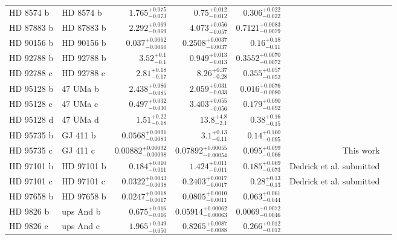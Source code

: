 \begin{longtable*}{llrrrrr}
HD 8574 b & HD 8574 b & $1.765^{+0.075}_{-0.073}$ & $0.75^{+0.012}_{-0.012}$ & $0.306^{+0.022}_{-0.022}$ & \cite{Perrier03} & \\
HD 87883 b & HD 87883 b & $2.292^{+0.069}_{-0.069}$ & $4.073^{+0.056}_{-0.057}$ & $0.7121^{+0.0083}_{-0.0079}$ & \cite{Fischer09} & \\
HD 90156 b & HD 90156 b & $0.037^{+0.0062}_{-0.0060}$ & $0.2508^{+0.0037}_{-0.0037}$ & $0.16^{+0.18}_{-0.11}$ & \cite{Mordasini11} & \\
HD 92788 b & HD 92788 b & $3.52^{+0.1}_{-0.1}$ & $0.949^{+0.013}_{-0.013}$ & $0.3552^{+0.0070}_{-0.0072}$ & \cite{Fischer01} & \\
HD 92788 c & HD 92788 c & $2.81^{+0.18}_{-0.17}$ & $8.26^{+0.37}_{-0.28}$ & $0.355^{+0.057}_{-0.052}$ & \cite{Rickman19} & \\
HD 95128 b & 47 UMa b & $2.438^{+0.086}_{-0.085}$ & $2.059^{+0.031}_{-0.033}$ & $0.016^{+0.0076}_{-0.0080}$ & \cite{Butler96} & \\
HD 95128 c & 47 UMa c & $0.497^{+0.032}_{-0.030}$ & $3.403^{+0.055}_{-0.056}$ & $0.179^{+0.090}_{-0.092}$ & \cite{Fischer02} & \\
HD 95128 d & 47 UMa d & $1.51^{+0.22}_{-0.18}$ & $13.8^{+4.8}_{-2.1}$ & $0.38^{+0.16}_{-0.15}$ & \cite{Gregory10} & \\
HD 95735 b & GJ 411 b & $0.0568^{+0.0091}_{-0.0083}$ & $3.1^{+0.13}_{-0.11}$ & $0.14^{+0.160}_{-0.095}$ & \cite{Diaz19} & \\
HD 95735 c & GJ 411 c & $0.00882^{+0.00092}_{-0.00098}$ & $0.07892^{+0.00055}_{-0.00054}$ & $0.095^{+0.099}_{-0.066}$ & This work & \\
HD 97101 b & HD 97101 b & $0.184^{+0.010}_{-0.011}$ & $1.424^{+0.011}_{-0.011}$ & $0.185^{+0.069}_{-0.073}$ & Dedrick et al. submitted & \\
HD 97101 c & HD 97101 c & $0.0322^{+0.0043}_{-0.0038}$ & $0.2403^{+0.0017}_{-0.0017}$ & $0.28^{+0.13}_{-0.13}$ & Dedrick et al. submitted & \\
HD 97658 b & HD 97658 b & $0.0247^{+0.0018}_{-0.0017}$ & $0.0805^{+0.0010}_{-0.0011}$ & $0.063^{+0.061}_{-0.044}$ & \cite{Howard11} & \\
HD 9826 b & ups And b & $0.675^{+0.016}_{-0.016}$ & $0.05914^{+0.00062}_{-0.00063}$ & $0.0069^{+0.0072}_{-0.0046}$ & \cite{Butler97} & \\
HD 9826 c & ups And c & $1.965^{+0.049}_{-0.050}$ & $0.8265^{+0.0087}_{-0.0088}$ & $0.266^{+0.012}_{-0.012}$ & \cite{Butler99} & \\

\end{longtable*}

